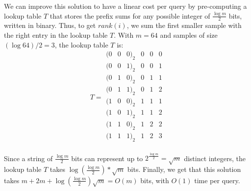\documentclass{article}
\begin{document}
We can improve this solution to have a linear cost per query by pre-computing a lookup table $T$ that stores the prefix sums for any possible integer of $\frac{\log m}{2}$ bits, written in binary. Thus, to get $rank(i)$, we sum the first smaller sample with the right entry in the lookup table $T$. With $m=64$ and samples of size $(\log 64)/2 = 3$, the lookup table $T$ is:
\[
    T=
    \begin{array}{ccc|ccc}
        (0 & 0 & 0)_2 & 0 & 0 & 0\\
        (0 & 0 & 1)_2 & 0 & 0 & 1\\
        (0 & 1 & 0)_2 & 0 & 1 & 1\\
        (0 & 1 & 1)_2 & 0 & 1 & 2\\
        (1 & 0 & 0)_2 & 1 & 1 & 1\\
        (1 & 0 & 1)_2 & 1 & 1 & 2\\
        (1 & 1 & 0)_2 & 1 & 2 & 2\\
        (1 & 1 & 1)_2 & 1 & 2 & 3\\
    \end{array}
\]

Since a string of $\frac{\log m}{2}$ bits can represent up to $2^{\frac{\log m}{2}}=\sqrt m$ distinct integers, the lookup table $T$ takes $\log(\frac{\log m}{2})*\sqrt m$ bits. Finally, we get that this solution takes $m+2m+\log (\frac{\log m}{2})\sqrt m=O(m)$ bits, with $O(1)$ time per query.
\end{document}
